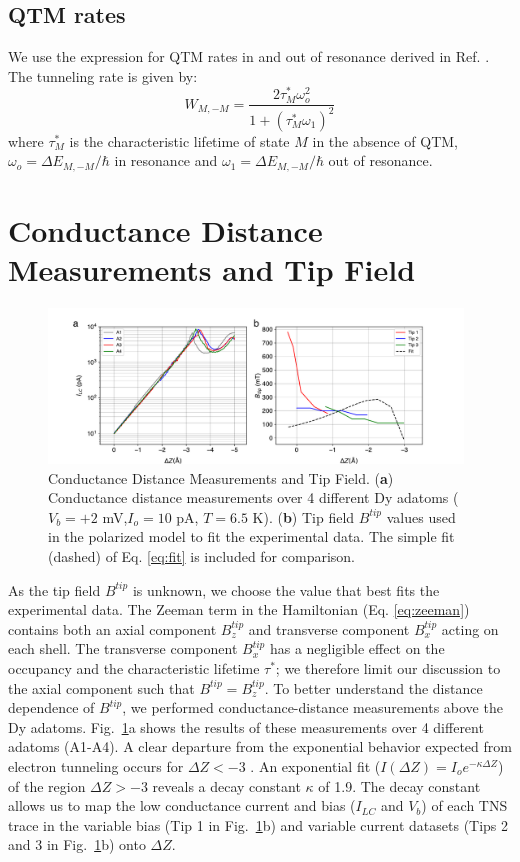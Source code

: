 \documentclass[reprint,amsmath,amssymb,aps,nofootinbib,onecolumn]{revtex4-2}
\begin{document}
\subsection{QTM rates}
We use the expression for QTM rates in and out of resonance derived in Ref. \cite{abragam1961,fort1998}. The tunneling rate is given by:
\begin{equation}
W_{M,-M} =  \frac{2 \tau^{*}_{M} \omega^{2}_{o}}{1 + (\tau^{*}_{M} \omega_{1})^2}
\label{eq:qtm}
\end{equation}
where $\tau^{*}_{M}$ is the characteristic lifetime of state $M$ in the absence of QTM, $\omega_{o} = \Delta E_{M,-M}/\hbar$ in resonance and $\omega_{1} = \Delta E_{M,-M}/\hbar$ out of resonance. 
\section{Conductance Distance Measurements and Tip Field}
\label{sec:cond-dist}
\begin{figure}[ht!]
\includegraphics[width=0.98\textwidth]{fields_fit2.pdf}
\caption{Conductance Distance Measurements and Tip Field. (\textbf{a}) Conductance distance measurements over 4 different Dy adatoms ($V_{b} = +2$ mV,$I_o = 10$ pA, $T = 6.5$ K). (\textbf{b}) Tip field $B^{tip}$ values used in the polarized model to fit the experimental data. The simple fit (dashed) of Eq. \ref{eq:fit} is included for comparison. 
\label{fig:fields} }
\end{figure}

As the tip field $B^{tip}$ is unknown, we choose the value that best fits the experimental data. The Zeeman term in the Hamiltonian (Eq. \ref{eq:zeeman}) contains both an axial component $B^{tip}_z$ and transverse component $B^{tip}_x$ acting on each shell. The transverse component $B^{tip}_x$ has a negligible effect on the occupancy and the characteristic lifetime $\tau^{*}$; we therefore limit our discussion to the axial component such that $B^{tip} = B^{tip}_z$. 
To better understand the distance dependence of $B^{tip}$, we performed conductance-distance measurements above the Dy adatoms. Fig.~\ref{fig:fields}a shows the results of these measurements over 4 different adatoms (A1-A4). A clear departure from the exponential behavior expected from electron tunneling occurs for $\Delta Z < -3$ \text{\normalfont\AA}. An exponential fit ($I(\Delta Z) = I_o e^{-\kappa \Delta Z}$) of the region $\Delta Z > -3$ \text{\normalfont\AA} reveals a decay constant $\kappa$ of 1.9. The decay constant allows us to map the low conductance current and bias ($I_{LC}$ and $V_{b}$) of each TNS trace in the variable bias (Tip 1 in Fig.~\ref{fig:fields}b) and variable current datasets (Tips 2 and 3 in Fig.~\ref{fig:fields}b) onto $\Delta Z$. 
\end{document}
